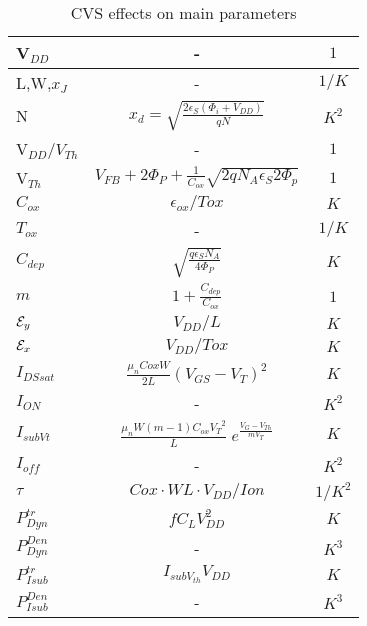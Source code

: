 \documentclass[a4paper, 12pt, twoside, openright]{report}
\begin{document}
\begin{enumerate}
 \begin{table}[h]
 \begin{center}
     \begin{tabular}{||l||c|c||} \hline \label{cvs}
      V$_{DD}$ & -& $ {1}$\\
      \hline
      L,W,$x_J$       &- & $ {1/K}$\\
      \hline
      N & $x_d=\sqrt{\frac{2\epsilon_S(\Phi_i+V_{DD})}{qN}}$&$ {K^2}$ \\
      \hline
      V$_{DD}/V_{Th}$ &- & ${1}$\\
      \hline
      V$_{Th}$ & $V_{FB}+2\Phi_P+\frac{1}{C_{ox}}\sqrt{2qN_A\epsilon_S 2\Phi_p}$& $ {1}$\\
      \hline
       $C_{ox}$&  $\epsilon_{ox}/Tox$ &$ {K}$\\ 
      \hline
      $T_{ox}$       &- & $ {1/K}$\\
      \hline
       $C_{dep}$&  $\sqrt{\frac{q\epsilon_SN_A}{4\Phi_P}}$ & ${K}$\\
      \hline
       $m$&  $1 +\frac{C_{dep}}{C_{ox}}$ &$ {1}$\\ 
      \hline
      ${\cal E}_y$ & $V_{DD}/L$ & $ {K}$\\
      \hline
      ${\cal E}_x$ & $V_{DD}/Tox$ & $ {K}$\\
      \hline
      $I_{DSsat}$      &$\frac{\mu_n Cox W}{2L}(V_{GS}-V_T)^2$ &$ {K}$\\ 
      \hline  
       $I_{ON}$      &- &$ {K}^2$\\ 
      \hline
       $I_{subVt}$      &$\frac{\mu_n W \left(m-1 \right) C_{ox} {V_T}^2}{L}\;
            e^{\displaystyle \frac{ {V_G-V_{Th}}}{ mV_T}}$ &$ {K}$\\ 
      \hline  
       $I_{off}$      &- &$ {K}^2$\\ 
      \hline
      $\tau$     &$Cox\cdot WL\cdot V_{DD}/Ion$ &$ {1/K^2}$\\ 
      \hline 
      $P_{Dyn}^{tr}$      &$fC_LV_{DD}^2$  &$ {K}$\\ 
      \hline 
      $P_{Dyn}^{Den}$      &-&$ {K^3}$\\ 
      \hline
       $P_{Isub}^{tr}$      &$I_{subV_{th}}V_{DD}$  &$ {K}$\\ 
      \hline 
       $P_{Isub}^{Den}$      &-&$ {K^3}$\\ 
      \hline
     \end{tabular}
\caption{CVS effects on main parameters}
\label{}
    \end{center}
	\end{table}


\end{enumerate}
\end{document}
